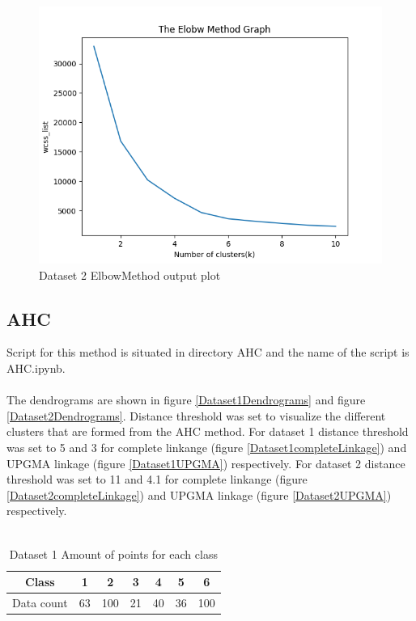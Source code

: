 \documentclass[12pt]{report}
\begin{document}
	\begin{figure}[H]
		\centering
		\includegraphics[scale=0.7]{../K-means/Output/Dataset2/ElbowMethod.png}
		\caption{Dataset 2 ElbowMethod output plot}
		\label{dataset2ElobowMethod}
	\end{figure}

	\newpage
	\subsection{AHC}
	Script for this method is situated in directory AHC and the name of the script is AHC.ipynb. \\
	\\
	The dendrograms are shown in figure \ref{Dataset1Dendrograms} and figure \ref{Dataset2Dendrograms}. Distance threshold was set to visualize the different clusters that are formed from the AHC method. For dataset 1 distance threshold was set to 5 and 3 for complete linkange (figure \ref{Dataset1completeLinkage}) and UPGMA linkage (figure \ref{Dataset1UPGMA}) respectively. For dataset 2 distance threshold was set to 11 and 4.1 for complete linkange (figure \ref{Dataset2completeLinkage}) and UPGMA linkage (figure \ref{Dataset2UPGMA}) respectively.\\
	\\
	\begin{table}[H]
		\centering
		\begin{tabular}{|c|c|c|c|c|c|c|}
			\hline
			Class & 1 & 2 & 3 & 4 & 5 & 6 \\
			\hline
			Data count & 63 & 100 & 21 & 40 & 36 & 100 \\
			\hline
		\end{tabular}
		\caption{Dataset 1 Amount of points for each class}
		\label{Dataset1ClassesCountTable}
	\end{table}
\end{document}
